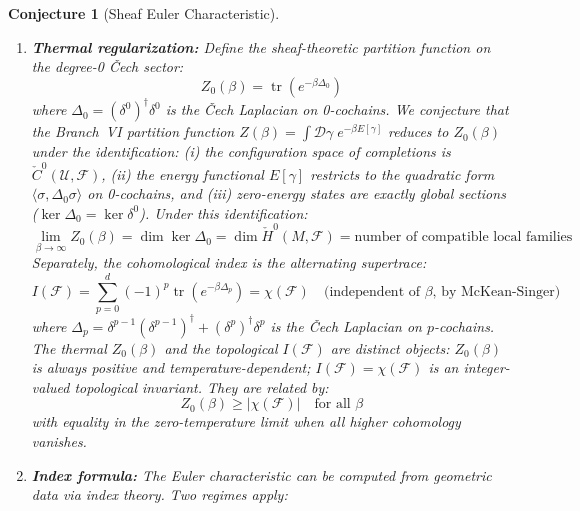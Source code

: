 \documentclass[11pt,letterpaper]{article}
\newtheorem{conjecture}{Conjecture}[section]
\newcommand{\tr}{\operatorname{tr}}
\newcommand{\Cech}{\check{C}}
\newcommand{\Hcech}{\check{H}}
\newcommand{\sheaf}{\mathcal{F}}
\newcommand{\cover}{\mathcal{U}}
\begin{document}
\begin{conjecture}[Sheaf Euler Characteristic]
\begin{enumerate}[label=(\alph*)]
    \item \textbf{Thermal regularization:} Define the 
    \emph{sheaf-theoretic partition function} on the degree-0 
    \v{C}ech sector:
    \begin{equation}\label{eq:Z_sheaf}
        Z_0(\beta) = \tr\left(e^{-\beta \Delta_0}\right)
    \end{equation}
    where $\Delta_0 = (\delta^0)^\dagger \delta^0$ is the \v{C}ech 
    Laplacian on 0-cochains. We \emph{conjecture} that the Branch~VI 
    partition function $Z(\beta) = \int \mathcal{D}\gamma \; 
    e^{-\beta E[\gamma]}$ reduces to $Z_0(\beta)$ under the 
    identification: (i) the configuration space of completions is 
    $\Cech^0(\cover, \sheaf)$, (ii) the energy functional $E[\gamma]$ 
    restricts to the quadratic form $\langle \sigma, \Delta_0 \sigma 
    \rangle$ on 0-cochains, and (iii) zero-energy states are exactly 
    global sections ($\ker \Delta_0 = \ker \delta^0$). Under this 
    identification:
    \begin{equation}\label{eq:thermal_euler}
        \lim_{\beta \to \infty} Z_0(\beta) = \dim \ker \Delta_0 
        = \dim \Hcech^0(M, \sheaf) 
        = \text{number of compatible local families}
    \end{equation}
    Separately, the \emph{cohomological index} is the alternating 
    supertrace:
    \begin{equation}\label{eq:Z_euler}
        I(\sheaf) = \sum_{p=0}^{d} (-1)^p \tr\left(e^{-\beta 
        \Delta_p}\right) = \chi(\sheaf) \quad \text{(independent of 
        } \beta \text{, by McKean-Singer)}
    \end{equation}
    where $\Delta_p = \delta^{p-1} (\delta^{p-1})^\dagger + 
    (\delta^p)^\dagger \delta^p$ is the \v{C}ech Laplacian on 
    $p$-cochains. The thermal $Z_0(\beta)$ and the topological 
    $I(\sheaf)$ are distinct objects: $Z_0(\beta)$ is always positive 
    and temperature-dependent; $I(\sheaf) = \chi(\sheaf)$ is an 
    integer-valued topological invariant. They are related by:
    \begin{equation}\label{eq:Z_chi_relation}
        Z_0(\beta) \geq |\chi(\sheaf)| \quad \text{for all } \beta
    \end{equation}
    with equality in the zero-temperature limit when all higher 
    cohomology vanishes.
    
    \item \textbf{Index formula:} The Euler characteristic can be 
    computed from geometric data via index theory. Two regimes apply:
    

\end{enumerate}
\end{conjecture}
\end{document}
